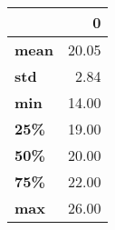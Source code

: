 \begin{tabular}{lr}
\toprule
{} &      0 \\
\midrule
\textbf{mean} &  20.05 \\
\textbf{std } &   2.84 \\
\textbf{min } &  14.00 \\
\textbf{25\% } &  19.00 \\
\textbf{50\% } &  20.00 \\
\textbf{75\% } &  22.00 \\
\textbf{max } &  26.00 \\
\bottomrule
\end{tabular}

